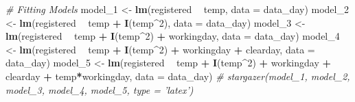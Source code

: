 \documentclass[]{article}
\newenvironment{Shaded}{\begin{snugshade}}{\end{snugshade}}
\newcommand{\KeywordTok}[1]{\textcolor[rgb]{0.13,0.29,0.53}{\textbf{#1}}}
\newcommand{\DataTypeTok}[1]{\textcolor[rgb]{0.13,0.29,0.53}{#1}}
\newcommand{\DecValTok}[1]{\textcolor[rgb]{0.00,0.00,0.81}{#1}}
\newcommand{\StringTok}[1]{\textcolor[rgb]{0.31,0.60,0.02}{#1}}
\newcommand{\CommentTok}[1]{\textcolor[rgb]{0.56,0.35,0.01}{\textit{#1}}}
\newcommand{\OperatorTok}[1]{\textcolor[rgb]{0.81,0.36,0.00}{\textbf{#1}}}
\newcommand{\NormalTok}[1]{#1}
\begin{document}
\begin{Shaded}
\begin{Highlighting}[]
\CommentTok{# Fitting Models}
\NormalTok{model_}\DecValTok{1}\NormalTok{ <-}\StringTok{ }\KeywordTok{lm}\NormalTok{(registered }\OperatorTok{~}\StringTok{ }\NormalTok{temp, }\DataTypeTok{data =}\NormalTok{ data_day)}
\NormalTok{model_}\DecValTok{2}\NormalTok{ <-}\StringTok{ }\KeywordTok{lm}\NormalTok{(registered }\OperatorTok{~}\StringTok{ }\NormalTok{temp }\OperatorTok{+}\StringTok{ }\KeywordTok{I}\NormalTok{(temp}\OperatorTok{^}\DecValTok{2}\NormalTok{), }\DataTypeTok{data =}\NormalTok{ data_day)}
\NormalTok{model_}\DecValTok{3}\NormalTok{ <-}\StringTok{ }\KeywordTok{lm}\NormalTok{(registered }\OperatorTok{~}\StringTok{ }\NormalTok{temp }\OperatorTok{+}\StringTok{ }\KeywordTok{I}\NormalTok{(temp}\OperatorTok{^}\DecValTok{2}\NormalTok{) }\OperatorTok{+}\StringTok{ }\NormalTok{workingday, }\DataTypeTok{data =}\NormalTok{ data_day)}
\NormalTok{model_}\DecValTok{4}\NormalTok{ <-}\StringTok{ }\KeywordTok{lm}\NormalTok{(registered }\OperatorTok{~}\StringTok{ }\NormalTok{temp }\OperatorTok{+}\StringTok{ }\KeywordTok{I}\NormalTok{(temp}\OperatorTok{^}\DecValTok{2}\NormalTok{) }\OperatorTok{+}\StringTok{ }\NormalTok{workingday }\OperatorTok{+}\StringTok{ }\NormalTok{clearday, }\DataTypeTok{data =}\NormalTok{ data_day)}
\NormalTok{model_}\DecValTok{5}\NormalTok{ <-}\StringTok{ }\KeywordTok{lm}\NormalTok{(registered }\OperatorTok{~}\StringTok{ }\NormalTok{temp }\OperatorTok{+}\StringTok{ }\KeywordTok{I}\NormalTok{(temp}\OperatorTok{^}\DecValTok{2}\NormalTok{) }\OperatorTok{+}\StringTok{ }\NormalTok{workingday }\OperatorTok{+}\StringTok{ }\NormalTok{clearday }\OperatorTok{+}\StringTok{ }\NormalTok{temp}\OperatorTok{*}\NormalTok{workingday, }\DataTypeTok{data =}\NormalTok{ data_day)}
\CommentTok{# stargazer(model_1, model_2, model_3, model_4, model_5, type = 'latex')}
\end{Highlighting}
\end{Shaded}
\end{document}

